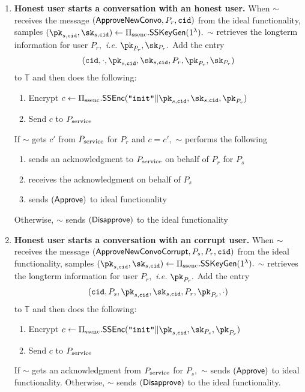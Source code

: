 \begin{enumerate}
	\item \textbf{Honest user starts a conversation with an honest user.} When $\sim$ receives the message $(\mathsf{ApproveNewConvo}, P_r, \mathtt{cid})$ from the ideal functionality, samples $(\pk_{s,\convoid}, \sk_{s,\convoid}) \leftarrow \sealedsenderencryptionscheme.\sealedsenderencryptiongen(1^\securityparameter).$  $\sim$ retrieves the longterm information for user $P_r,$ {\em i.e.} $\pk_{P_r}, \sk_{P_r}.$  Add the entry $$(\convoid, \cdot, \pk_{s,\convoid}, \sk_{s,\convoid}, P_r, \pk_{P_r}, \sk_{P_r})$$ to $\mathbb{T}$ and then does the following:
	\begin{enumerate}
		\item Encrypt $c \leftarrow \sealedsenderencryptionscheme.\sealedsenderencryptionenc(\texttt{``init''} \| \pk_{s,\convoid}, \allowbreak \sk_{s,\convoid}, \pk_{P_r})$
		\item Send $c$ to $P_{\text{service}}$
	\end{enumerate}
	If $\sim$ gets $c'$ from $P_{\text{service}}$ for $P_r$ and $c=c',$ $\sim$ performs the following 
	\begin{enumerate}
		\item sends an acknowledgment to $P_{\text{service}}$ on behalf of $P_r$ for $P_s$
		\item receives the acknowledgment on behalf of $P_s$
		\item sends $(\mathsf{Approve})$ to ideal functionality
	\end{enumerate}
	Otherwise, $\sim$ sends $(\mathsf{Disapprove})$ to the ideal functionality

	\item \textbf{Honest user starts a conversation with an corrupt user.}  When $\sim$ receives the message $(\mathsf{ApproveNewConvoCorrupt}, P_s, P_r, \mathtt{cid})$ from the ideal functionality, samples $(\pk_{s,\convoid}, \sk_{s,\convoid}) \leftarrow \sealedsenderencryptionscheme.\sealedsenderencryptiongen(1^\securityparameter).$  $\sim$ retrieves the longterm information for user $P_r,$ {\em i.e.} $\pk_{P_r}.$  Add the entry $$(\convoid, P_s, \pk_{s,\convoid}, \sk_{s,\convoid}, P_r, \pk_{P_r}, \cdot)$$ to $\mathbb{T}$ and then does the following:
	\begin{enumerate}
		\item Encrypt $c \leftarrow \sealedsenderencryptionscheme.\sealedsenderencryptionenc(\texttt{``init''} \| \pk_{s,\convoid}, \allowbreak \sk_{P_s}, \pk_{P_r})$
		\item Send $c$ to $P_{\text{service}}$
	\end{enumerate}
	If $\sim$ gets an acknowledgment from $P_{\text{service}}$ for $P_s,$ $\sim$ sends $(\mathsf{Approve})$ to ideal functionality.  Otherwise, $\sim$ sends $(\mathsf{Disapprove})$ to the ideal functionality.



\end{enumerate}
